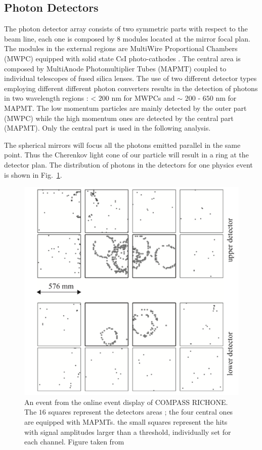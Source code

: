 \subsection{Photon Detectors}

The photon detector array consists of two symmetric parts with respect to the beam line, each one is composed by $8$ modules located at the mirror focal plan. The modules in the external regions are MultiWire Proportional Chambers (MWPC) equipped with solid state CsI photo-cathodes \cite{RICHLimits}. The central area is composed by MultiAnode Photomultiplier Tubes (MAPMT) \cite{RICHUpgrade} coupled to individual telescopes of fused silica lenses. The use of two different detector types employing different different photon converters results in the detection of photons in two wavelength regions : < $200$ nm for MWPCs and $\sim$ $200$ - $650$ nm for MAPMT. The low momentum particles are mainly detected by the outer part (MWPC) while the high momentum ones are detected by the central part (MAPMT). Only the central part is used in the following analysis.

The spherical mirrors will focus all the photons emitted parallel in the same point. Thus the Cherenkov light cone of our particle will result in a ring at the detector plan. The distribution of photons in the detectors for one physics event is shown in Fig.~\ref{pic:RICHEvent}.

\begin{figure}[!h]
  \centering
	\includegraphics[scale=0.5]{./gfx/RICHEvent.png}
	\caption{An event from the online event display of COMPASS RICHONE. The $16$ squares represent the detectors areas ; the four central ones are equipped with MAPMTs. the small squares represent the hits with signal amplitudes larger than a threshold, individually set for each channel. Figure taken from \cite{NIM2015}}
	\label{pic:RICHEvent}
\end{figure}

